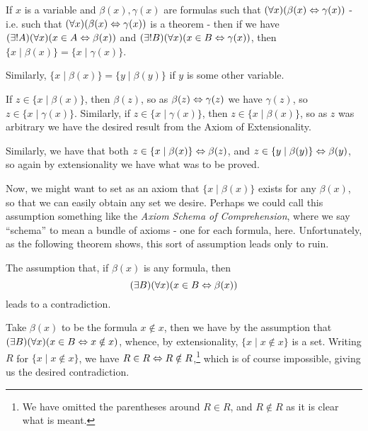 \begin{thm}
\label{Thm: Some trivial set builder equalities}
If $x$ is a variable and $\beta(x), \gamma(x)$ are formulas such that $(\forall x)(\beta(x)\Leftrightarrow\gamma(x))$ - i.e. such that $(\forall x)(\beta(x) \Leftrightarrow \gamma(x))$ is a theorem - then if we have $(\exists! A)(\forall x)(x\in A \Leftrightarrow \beta(x))$ and $(\exists! B)(\forall x)(x\in B \Leftrightarrow \gamma(x))$, then $\{x \mid \beta(x)\} = \{x \mid \gamma(x)\}$. 

Similarly, $\{ x \mid \beta(x)\} = \{y \mid \beta(y)\}$ if $y$ is some other variable.
\end{thm}

\begin{prf}
If $z\in \{x \mid \beta(x)\}$, then $\beta(z)$, so as $\beta(z)\Leftrightarrow\gamma(z)$ we have $\gamma(z)$, so $z\in\{x\mid\gamma(x)\}$. Similarly, if $z\in\{x\mid\gamma(x)\}$, then $z\in\{x\mid\beta(x)\}$, so as $z$ was arbitrary we have the desired result from the Axiom of Extensionality. 

Similarly, we have that both $z\in\{x\mid\beta(x)\}\Leftrightarrow\beta(z)$, and $z\in\{y\mid\beta(y)\}\Leftrightarrow\beta(y)$, so again by extensionality we have what was to be proved.
\end{prf}

Now, we might want to set as an axiom that $\{x\mid \beta(x)\}$ exists for any $\beta(x)$, so that we can easily obtain any set we desire.  Perhaps we could call this assumption something like the \emph{Axiom Schema of Comprehension}, where we say \enquote{schema} to mean a bundle of axioms - one for each formula, here. Unfortunately, as the following theorem shows, this sort of assumption leads only to ruin.

\begin{thm} 
\label{Thm: Russell's paradox}
 The assumption that, if $\beta(x)$ is any formula, then $$(\exists B)(\forall x)(x\in B\Leftrightarrow\beta(x))$$ leads to a contradiction.
\end{thm}

\begin{prf}
Take $\beta(x)$ to be the formula $x\notin x$, then we have by the assumption that $(\exists B)(\forall x)(x\in B\Leftrightarrow x\notin x)$, whence, by extensionality, $\{x\mid x\notin x\}$ is a set. Writing $R$ for $\{x\mid x\notin x\}$, we have $R\in R \Leftrightarrow R\notin R$,\footnote{We have omitted the parentheses around $R\in R$, and $R\notin R$ as it is clear what is meant.} which is of course impossible, giving us the desired contradiction. 
\end{prf}

